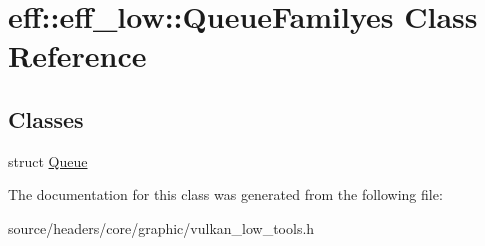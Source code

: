 \hypertarget{classeff_1_1eff__low_1_1QueueFamilyes}{}\section{eff\+:\+:eff\+\_\+low\+:\+:Queue\+Familyes Class Reference}
\label{classeff_1_1eff__low_1_1QueueFamilyes}
\subsection*{Classes}
\begin{DoxyCompactItemize}
\item 
struct \mbox{\hyperlink{structeff_1_1eff__low_1_1QueueFamilyes_1_1Queue}{Queue}}
\end{DoxyCompactItemize}


The documentation for this class was generated from the following file\+:\begin{DoxyCompactItemize}
\item 
source/headers/core/graphic/vulkan\+\_\+low\+\_\+tools.\+h\end{DoxyCompactItemize}
